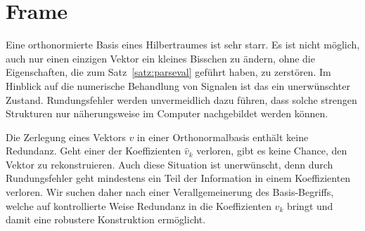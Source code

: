 %
%
%
\section{Frame\label{section:frame}}
Eine orthonormierte Basis eines Hilbertraumes ist sehr starr.
Es ist nicht möglich, auch nur einen einzigen Vektor ein kleines
Bisschen zu ändern, ohne die Eigenschaften, die zum Satz~\ref{satz:parseval}
geführt haben, zu zerstören.
Im Hinblick auf die numerische Behandlung von Signalen ist das
ein unerwünschter Zustand.
Rundungsfehler werden unvermeidlich dazu führen, dass solche strengen
Strukturen nur näherungsweise im Computer nachgebildet werden 
können.

Die Zerlegung eines Vektors $v$ in einer Orthonormalbasis enthält keine
Redundanz.
Geht einer der Koeffizienten $\hat{v}_k$ verloren, gibt es keine
Chance, den Vektor zu rekonstruieren.
Auch diese Situation ist unerwünscht, denn durch Rundungsfehler geht
mindestens ein Teil der Information in einem Koeffizienten verloren.
Wir suchen daher nach einer Verallgemeinerung des Basis-Begriffs, welche
auf kontrollierte Weise Redundanz in die Koeffizienten $\hat{v}_k$
bringt und damit eine robustere Konstruktion ermöglicht.

%
%
